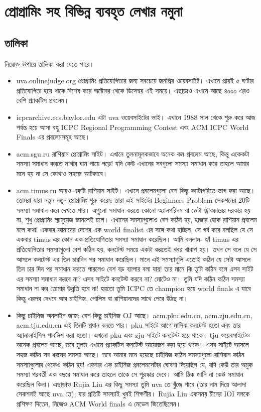 \chapter{প্রোগ্রামিং সহ বিভিন্ন ব্যবহৃত লেখার নমুনা}

\section{তালিকা}

নিম্নোক্ত উপায়ে তালিকা করা যেতে পারে।
\begin{itemize}
\item uva.onlinejudge.org প্রোগ্রামিং প্রতিযোগিতার জন্য সবচেয়ে জনপ্রিয় ওয়েবসাইট। এখানে প্রায়ই ৫ ঘণ্টার প্রতিযোগিতা হয়ে থাকে বিশেষ করে অক্টোবর থেকে ডিসেম্বর এই সময়ে। এছাড়াও এখানে আছে ৪০০০ এরও বেশি প্র্যাকটিস প্রবলেম। 
\item icpcarchive.ecs.baylor.edu এটা uva ওয়েবসাইটের ভাই। এখানে 1988 সাল থেকে শুরু করে আজ পর্যন্ত হয়ে আসা বহু ICPC Regional Programming Contest এবং ACM ICPC World Finals এর প্রবলেমসমূহ আছে।
\item acm.sgu.ru রাশিয়ান প্রোগ্রামিং সাইট। এখানে তুলনামূলকভাবে অনেক কম প্রবলেম আছে, কিন্তু একেকটা সমস্যা সমাধান করতে মাথার ঘাম পায়ে পড়ে! যদি কেউ এখানের সবগুলো সমস্যা সমাধান করে তাহলে আমার মনে হয় না সে কোথাও সহজে আটকাবে।
\item acm.timus.ru আরও একটি রাশিয়ান সাইট। এখানে প্রবলেমগুলো বেশ কিছু ক্যাটাগরিতে ভাগ করা আছে। তোমরা যারা নতুন নতুন প্রোগ্রামিং শুরু করেছ তারা এই সাইটের Beginners Problem সেকশনের 20টি সমস্যা সমাধান করে দেখতে পার। এগুলো সমাধান করতে কোনো অ্যালগরিদম বা ডেটা স্ট্রাকচারের দরকার হয় না, শুধু প্রোগ্রামিং ল্যাঙ্গুয়েজ জানলেই চলে। এখানের সমস্যাগুলোও বেশ কঠিন হয়, হাজার হোক রাশিয়ান প্রবলেম বলে কথা! একবার আমাদের দেশের এক world finalist এর সঙ্গে কথা হচ্ছিল, সে গর্ব করে বলছিল যে সে একবার timus এর কোন এক প্রতিযোগিতার সমস্যা সমাধান করেছিল। আমি বললাম- হ্যাঁ timus এর প্রতিযোগিতার সমস্যাগুলো বেশ কঠিন হয়, কনটেস্ট সময়ে একটা করতেই খবর খারাপ হয়। তখন সে বলে যে সে আসলে কনটেস্ট এর তিন চারদিন পর সমাধান করেছিল। মানে এই সমস্যাগুলি এতোই কঠিন যে সেটা আসলে তিন চার দিন পর সমাধান করতে পারলেও বেশ বড় ব্যাপার বলা যায়! তার মানে কি তুমি কঠিন বলে এসব সাইট এর সমস্যা সমাধান করবে না? এসব সাইটে কনটেস্ট করবে না? মোটেও না। তুমি যদি কঠিন কঠিন সমস্যা সমাধান না কর তোমার উন্নতি হবে না! হয়তো তুমি ICPC তে champion হয়ে world finals এ যাবে কিন্তু এরপর দেখবে আর চাইনিজ, পোলিস বা রাশিয়ানদের সাথে পেরে উঠছ না।
\item {\bnbf কিছু চাইনিজ অনলাইন জাজ:} বেশ কিছু চাইনিজ OJ আছে। acm.pku.edu.cn, acm.zju.edu.cn, acm.tju.edu.cn এই তিনটি প্রধান বলতে পার। pku সাইটে আগে মাসিক কনটেস্ট হতো এবং তার অ্যানালাইসিস পাবলিশ করা হতো। এখনো pku এবং zju সাইটে কনটেস্ট হয়ে থাকে। tju ওয়েবসাইটেও অনেক প্রবলেম আছে, তবে মূলত এখানে প্র্যাকটিস কনটেস্ট আয়োজন করা হয়ে থাকে। এসব সাইটে আসলে সহজ কঠিন সব ধরনের সমস্যা আছে। তবে আমার মনে হয়েছে চাইনিজ কঠিন সমস্যাগুলো রাশিয়ান কঠিন সমস্যাগুলোর থেকেও কঠিন হয়! একবার এক চাইনিজ প্রবলেমসেটার ঘোষণা দিয়েছিল যে, যদি কেউ তার অমুক সমস্যা পরবর্তী এক বছরে সমাধান করে তাহলে তাকে সে পুরস্কার দেবে। আমি ঠিক জানি না কেউ সমাধান করেছিল কিনা। এছাড়াও Rujia Liu এর কিছু সমস্যা তুমি uva তে খুঁজে পাবে (তার নাম দিয়ে আলাদা সেকশনই আছে uva তে), যার প্রতিটি সমস্যাই খুবই শিক্ষণীয়। Rujia Liu একসময় চীনের IOI দলকে প্রশিক্ষণ দিতেন, নিজেও ACM World finals এ মেডেল জিতেছিলেন।
\end{itemize}

